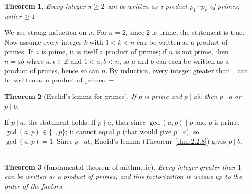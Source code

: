 \documentclass[11pt]{article}
\makeatletter
\theoremstyle{ntstyle}
\newtheorem{theorem}{Theorem}[subsection]
\let\nt@closedisplay\]
\def\nt@guardedclose{\@ifnextchar\par{\nt@closeafterpar}{\@ifnextchar\end{\postdisplaypenalty\@M\nt@closedisplay}{\nt@closedisplay}}}
\def\nt@closeafterpar\par{\@ifnextchar\par{\nt@closeafterpar}{\@ifnextchar\end{\postdisplaypenalty\@M\nt@closedisplay\par}{\nt@closedisplay\par}}}
\renewenvironment{proof}[1][\proofname]{\par
  \pushQED{\qed}\normalfont\topsep\medskipamount\edef\nt@afterproof{\@endparpenalty=\the\@endparpenalty\relax}\@beginparpenalty\@M\@endparpenalty\@M\let\]\nt@guardedclose\trivlist\item[]\textit{#1\@addpunct{.}} \ignorespaces}{\ifvmode\addpenalty\@M\fi\popQED\nt@afterproof\endtrivlist\@endpefalse}
\makeatother
\begin{document}
\begin{theorem}\label{thm:2.3.1} Every integer $n\ge2$ can be written as a
	product $p_1\cdots p_r$ of primes, with $r\ge1$.
\end{theorem}

\begin{proof} We use strong induction on $n$. For $n = 2$,
	since $2$ is prime, the statement is true. Now assume
	every integer $k$ with $1 < k < n$ can be written as a product of
	primes. If $n$ is prime, it is itself a product of
	primes; if $n$ is not prime, then $n = ab$ where $a, b \in
		\mathbb{Z}$ and $1 < a, b < n$, so $a$ and $b$ can each be written as
	a product of primes, hence so can $n$. By induction, every integer
	greater than $1$ can be written as a product of primes.
\end{proof}
\begin{theorem}[Euclid's lemma for primes]\label{thm:2.3.2} If $p$ is prime and $p \mid ab$, then $p \mid a$ or $p \mid b$.
\end{theorem}

\begin{proof} If $p \mid a$, the statement holds. If $p
		\nmid a$, then since $\gcd(a, p) \mid p$ and $p$ is prime, $\gcd(a, p)
		\in \{1, p\}$; it cannot equal $p$ (that would give $p \mid a$), so
	$\gcd(a, p)=1$. Since $p \mid ab$, Euclid's lemma (Theorem~\ref{thm:2.2.8}) gives
	$p \mid b$.
\end{proof}
\begin{theorem}[fundamental theorem of arithmetic]\label{thm:2.3.3}
	Every integer greater than $1$ can be written as a product of primes, and
	this factorization is unique up to the order of the factors.
\end{theorem}
\end{document}
